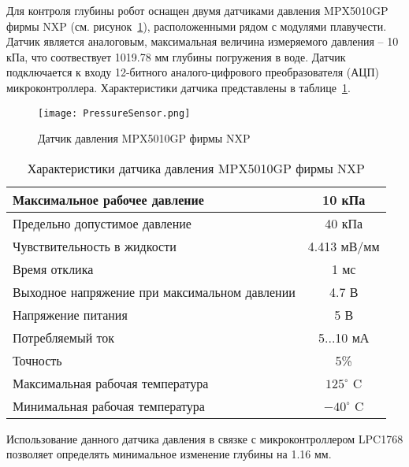 


Для контроля глубины робот оснащен двумя датчиками давления MPX5010GP фирмы NXP (см. рисунок~\ref{PressureSensor}), расположенными рядом с модулями плавучести. Датчик является аналоговым, максимальная величина измеряемого давления -- 10 кПа, что соотвествует 1019.78 мм глубины погружения в воде. Датчик подключается к входу 12-битного аналого-цифрового преобразователя (АЦП) микроконтроллера. Характеристики датчика представлены в таблице~\ref{tabPressure}.

\begin{figure}[h]
	\centering
	\texttt{[image: PressureSensor.png]}%
	\caption{Датчик давления MPX5010GP фирмы NXP}
	\label{PressureSensor}
\end{figure}

\begin{table}[h]
	\centering
	\caption{Характеристики датчика давления MPX5010GP фирмы NXP}\label{tabPressure}
	\begin{tabular}{|l|c|}
		\hline
		Максимальное рабочее давление	&	10 кПа 	\\ \hline
		Предельно допустимое давление & 40 кПа \\ \hline
		Чувствительность в жидкости	& 4.413 мВ/мм \\ \hline
		Время отклика 	& 1 мс \\ \hline
		Выходное напряжение при максимальном давлении	&  4.7 В\\ \hline
		Напряжение питания 	& 5 В\\ \hline	
		Потребляемый ток	& 5...10 мА\\ \hline	
		Точность	& 5\% \\ \hline
		Максимальная рабочая температура	&	$125^\circ$ C 	\\ \hline
		Минимальная рабочая температура 	&	$-40^\circ$ C \\ \hline
	\end{tabular}
\end{table}

Использование данного датчика давления в связке с микроконтроллером LPC1768 позволяет определять минимальное изменение глубины на 1.16 мм. 



